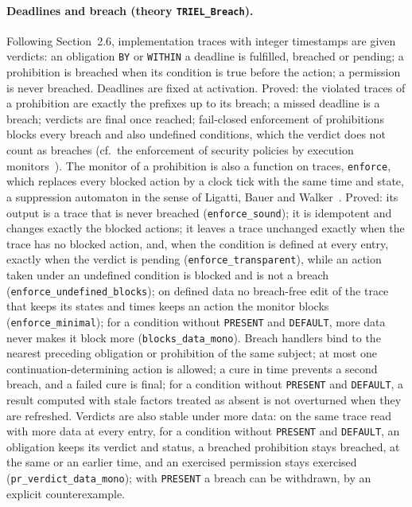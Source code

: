 \documentclass[11pt,a4paper]{article}
\begin{document}
\paragraph{Deadlines and breach (theory \texttt{TRIEL\_Breach}).}
Following Section~2.6, implementation traces with integer timestamps are given verdicts:
an obligation \texttt{BY} or \texttt{WITHIN} a deadline is fulfilled, breached or pending;
a prohibition is breached when its condition is true before the action; a permission is
never breached. Deadlines are fixed at activation. Proved: the violated traces of a
prohibition are exactly the prefixes up to its breach; a missed deadline is a breach;
verdicts are final once reached; fail-closed enforcement of prohibitions blocks every
breach and also undefined conditions, which the verdict does not count as breaches (cf.\
the enforcement of security policies by execution monitors~\cite{Schneider2000}). The
monitor of a prohibition is also a function on traces, \texttt{enforce}, which replaces
every blocked action by a clock tick with the same time and state, a suppression automaton
in the sense of Ligatti, Bauer and Walker~\cite{LigattiBauerWalker2005}. Proved: its output
is a trace that is never breached (\texttt{enforce\_sound}); it is idempotent and changes
exactly the blocked actions; it leaves a trace unchanged exactly when the trace has no
blocked action, and, when the condition is defined at every entry, exactly when the
verdict is pending (\texttt{enforce\_transparent}), while an action taken under an undefined
condition is blocked and is not a breach (\texttt{enforce\_undefined\_blocks}); on defined
data no breach-free edit of the trace that keeps its states and times keeps an action the
monitor blocks (\texttt{enforce\_minimal}); for a condition without \texttt{PRESENT} and
\texttt{DEFAULT}, more data never
makes it block more (\texttt{blocks\_data\_mono}). Breach
handlers bind to the nearest preceding obligation or prohibition of the same subject; at most one
continuation-determining action is allowed; a cure in time prevents a second breach, and a
failed cure is final; for a condition without \texttt{PRESENT} and \texttt{DEFAULT}, a result
computed with stale factors treated as absent is not overturned when they are refreshed.
Verdicts are also stable under more data: on the same
trace read with more data at every entry, for a condition without \texttt{PRESENT} and
\texttt{DEFAULT}, an obligation keeps its verdict and status, a breached prohibition stays
breached, at the same or an earlier time, and an exercised permission stays exercised
(\texttt{pr\_verdict\_data\_mono}); with \texttt{PRESENT} a breach can be withdrawn, by an
explicit counterexample.
\end{document}
